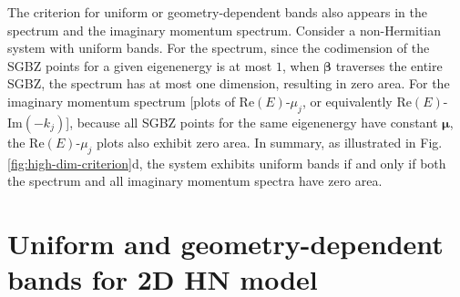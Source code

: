 The criterion for uniform or geometry-dependent bands also appears
in the spectrum and the imaginary momentum spectrum. Consider a non-Hermitian
system with uniform bands. For the spectrum, since the codimension
of the SGBZ points for a given eigenenergy is at most $1$, when $\boldsymbol{\beta}$
traverses the entire SGBZ, the spectrum has at most one dimension,
resulting in zero area. For the imaginary momentum spectrum {[}plots
of $\text{Re}(E)$-$\mu_{j}$, or equivalently $\text{Re}(E)$-$\text{Im}(-k_{j})${]},
because all SGBZ points for the same eigenenergy have constant $\boldsymbol{\mu}$,
the $\text{Re}(E)$-$\mu_{j}$ plots also exhibit zero area. In summary,
as illustrated in Fig. \ref{fig:high-dim-criterion}d, the system
exhibits uniform bands if and only if both the spectrum and all imaginary
momentum spectra have zero area.

\section{Uniform and geometry-dependent bands for 2D HN model}
\label{sec:uniform-band-HN-model}

